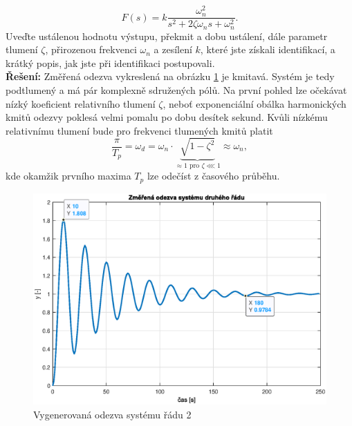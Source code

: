 \documentclass[twoside]{article}
\begin{document}
\begin{equation}
	F(s) = k \frac{\omega_n^2}{s^2 + 2\zeta \omega_n s + \omega_n^2}.
	\label{eq:obecne2}
\end{equation}
Uveďte ustálenou hodnotu výstupu, překmit a dobu ustálení, dále parametr tlumení $\zeta$,
přirozenou frekvenci $\omega_n$ a zesílení $k$, které jste získali identifikací, a
krátký popis, jak jste při identifikaci postupovali. \\
\textbf{Řešení:} Změřená odezva vykreslená na obrázku \ref{fig:zadani2} je kmitavá. Systém je tedy podtlumený a má pár komplexně sdružených pólů.
Na první pohled lze očekávat nízký koeficient relativního tlumení $\zeta$, neboť exponenciální obálka harmonických kmitů odezvy poklesá velmi pomalu po dobu desítek sekund.
Kvůli nízkému relativnímu tlumení bude pro frekvenci tlumených kmitů platit
\begin{equation}
	\frac{\pi}{T_p} =\omega_d = \omega_n \cdot \underbrace{\sqrt{1 - \zeta^2}}_{\approx 1 \text{ pro } \zeta \lll 1} \approx \omega_n,
	\label{eq:damped_freq}
\end{equation}
kde okamžik prvního maxima $T_p$ lze odečíst z časového průběhu.
\begin{figure}[hbtp]
	\centering
	\includegraphics[width=\linewidth]{zadani2.eps}
	\caption{Vygenerovaná odezva systému řádu 2}
	\label{fig:zadani2}
\end{figure}
\end{document}
